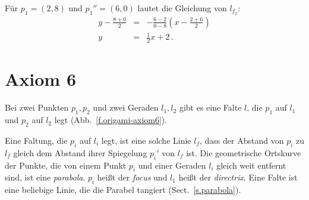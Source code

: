 \begin{example}
Für $p_1=(2,8)$ und $p_1''=(6,0)$ lautet die Gleichung von $l_{f_2}$:
\begin{eqnarray*}
y-\frac{8+0}{2}&=&-\frac{6-2}{0-8}\left(x-\frac{2+6}{2}\right)\\
y&=&\frac{1}{2}x+2\,.
\end{eqnarray*}
\end{example}


\section{Axiom 6}\label{s.ax6}
\begin{axiom}
Bei zwei Punkten $p_1,p_2$ und zwei Geraden $l_1,l_2$ gibt es eine Falte $l$, die $p_1$ auf $l_1$ und $p_2$ auf $l_2$ legt (Abb.~\ref{f.origami-axiom6}).
\end{axiom}

Eine Faltung, die $p_i$ auf $l_i$ legt, ist eine solche Linie $l_f$, dass der Abstand von $p_i$ zu $l_f$ gleich dem Abstand ihrer Spiegelung $p_i'$ von $l_f$ ist. Die geometrische Ortskurve der Punkte, die von einem Punkt $p_i$ und einer Geraden $l_i$ gleich weit entfernt sind, ist eine \emph{parabola}. $p_i$ heißt der \emph{focus} und $l_1$ heißt der \emph{directrix}. Eine Falte ist eine beliebige Linie, die die Parabel tangiert (Sect.~\ref{s.parabola}).


